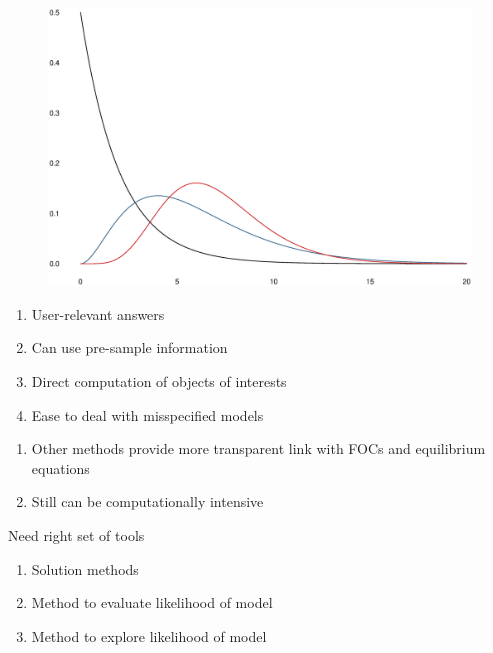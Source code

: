 \documentclass{beamer}
\begin{document}
\begin{frame}
\begin{figure}
    \includegraphics[scale=.3]{prior_gamma.eps}
  \end{figure}
\end{frame}


\begin{frame}
  \begin{enumerate}
    \item User-relevant answers
    \item Can use pre-sample information
    \item Direct computation of objects of interests
    \item Ease to deal with misspecified models
  \end{enumerate}
  \begin{enumerate}
    \item Other methods provide more transparent link with FOCs and equilibrium equations
    \item Still can be computationally intensive
  \end{enumerate}
\end{frame}

\begin{frame}
 Need right set of tools
 \begin{enumerate}
   \item Solution methods
   \item Method to evaluate likelihood of model
   \item Method to explore likelihood of model
 \end{enumerate}
\end{frame}
\end{document}
